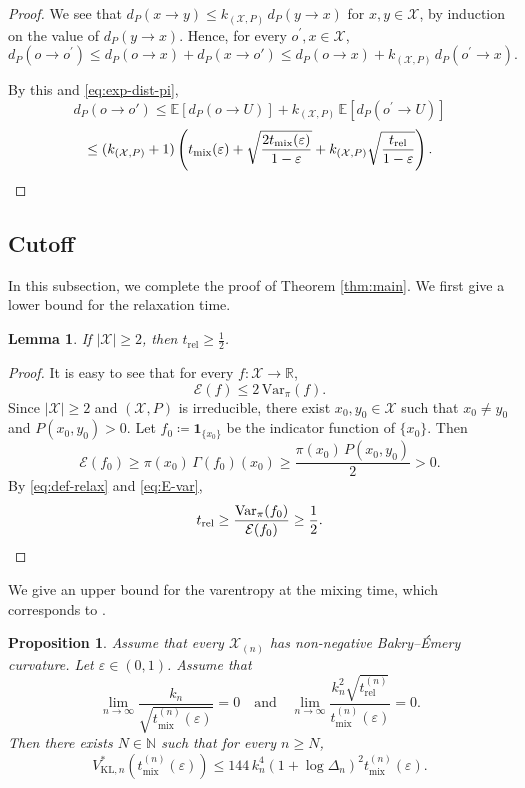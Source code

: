 \documentclass[a4paper, reqno, 11pt]{amsart}
\newtheorem{Lem}[Thm]{Lemma}
\newtheorem{Prop}[Thm]{Proposition}
\theoremstyle{definition}
\begin{document}
\begin{proof}
We see that
$d_P (x \to y) \le k_{(\mathcal{X}, P)}\,d_P (y \to x)$ for $x, y \in \mathcal{X}$,
by induction on the value of $d_P (y\to x)$.
Hence, for every $o^{\prime}, x \in \mathcal{X}$,
\[ d_P (o \to o^{\prime}) \le d_P (o\to x) + d_P (x\to o') \le d_P (o\to x)+k_{(\mathcal{X}, P)}\,d_P (o^{\prime} \to x). \]

By this and \eqref{eq:exp-dist-pi},
\[ d_P (o \to o') \le \mathbb{E}[d_P (o\to U)] + k_{(\mathcal{X}, P)}\, \mathbb{E}\left[d_P (o^{\prime}  \to U)\right] \]
\[ \le (k_{(\mathcal{X}, P)}+1)\left(t_{\mathrm{mix}}(\varepsilon) + \sqrt{\frac{2 t_{\mathrm{mix}}(\varepsilon)}{1-\varepsilon}} +k_{(\mathcal{X}, P)}\sqrt{\frac{t_{\mathrm{rel}}}{1-\varepsilon}} \right). \qedhere \]
\end{proof}

\subsection{Cutoff}\label{subsec:cutoff}

In this subsection, we complete the proof of Theorem \ref{thm:main}.
We first give a lower bound for the relaxation time.

\begin{Lem}\label{lem:trel-lower}
If $|\mathcal{X}| \ge 2$, then $t_{\mathrm{rel}} \ge \frac{1}{2}$.
\end{Lem}

\begin{proof}
It is easy to see that for every $f : \mathcal{X} \to \mathbb{R}$,
\begin{equation}\label{eq:E-var}
\mathcal{E}(f) \le 2\,\mathrm{Var}_{\pi}(f).
\end{equation}
Since $|\mathcal{X}| \ge 2$ and $(\mathcal{X}, P)$ is irreducible,
there exist $x_0, y_0 \in \mathcal{X}$ such that $x_0 \ne y_0$ and $P(x_0, y_0) > 0$.
Let $f_0 \coloneqq \mathbf{1}_{\{x_0\}}$ be the indicator function of $\{x_0\}$.
Then
\[ \mathcal{E}(f_0) \ge \pi(x_0)\,\Gamma(f_0)(x_0) \ge \frac{\pi(x_0)\,P(x_0,y_0)}{2} > 0. \]
By \eqref{eq:def-relax} and \eqref{eq:E-var},
\[ t_{\mathrm{rel}} \ge \frac{\mathrm{Var}_{\pi}(f_0)}{\mathcal{E}(f_0)} \ge \frac{1}{2}. \qedhere \]
\end{proof}

We give an upper bound for the varentropy at the mixing time, which corresponds to \cite[Theorem 6]{Salez2024}. 

\begin{Prop}\label{thm:7.2}
Assume that every $\mathcal{X}_{(n)}$ has non-negative Bakry--\'Emery curvature.
Let $\varepsilon \in (0,1)$.
Assume that
\begin{equation}\label{eq:assump-varentropy}
\lim_{n \to \infty} \frac{k_n}{\sqrt{t_{\mathrm{mix}}^{(n)}(\varepsilon)}} = 0
\quad \text{and} \quad
\lim_{n \to \infty} \frac{k_n^{2}\sqrt{t_{\mathrm{rel}}^{(n)}}}{t_{\mathrm{mix}}^{(n)}(\varepsilon)} = 0.
\end{equation}
Then there exists $N \in \mathbb{N}$ such that for every $n \ge N$,
\[ V_{\mathrm{KL},n}^{*}\!\left(t_{\mathrm{mix}}^{(n)}(\varepsilon)\right) \le 144\,k_n^{4}\left(1+\log \Delta_n\right)^{2} t_{\mathrm{mix}}^{(n)}(\varepsilon). \]
\end{Prop}
\end{document}
